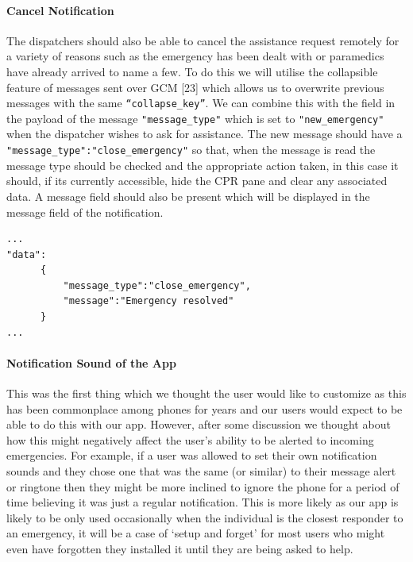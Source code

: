 \documentclass{article}
\begin{document}
	\pagebreak
	\paragraph{Cancel Notification}
	The dispatchers should also be able to cancel the assistance request remotely for a variety of reasons such as the emergency has been dealt with or paramedics have already arrived to name a few. To do this we will utilise the collapsible feature of messages sent over GCM [23] which allows us to overwrite previous messages with the same \texttt{\color{OliveGreen}“collapse\_key”}. We can combine this with the field in the payload of the message \texttt{\color{OliveGreen}"message\_type"} which is set to \texttt{\color{OliveGreen}"new\_emergency"} when the dispatcher wishes to ask for assistance. The new message should have a  \texttt{\color{OliveGreen}"message\_type":"close\_emergency"} so that, when the message is read the message type should be checked and the appropriate action taken, in this case it should, if its currently accessible, hide the CPR pane and clear any associated data. A message field should also be present which will be displayed in the message field of the notification.
	\begin{lstlisting}
...
"data":
      {
          "message_type":"close_emergency",
          "message":"Emergency resolved"
      }
...
	\end{lstlisting}
	
	\paragraph{Notification Sound of the App}
	This was the first thing which we thought the user would like to customize as this has been  commonplace among phones for years and our users would expect to be able to do this with our app. However, after some discussion we thought about how this might negatively affect the user’s ability to be alerted to incoming emergencies. For example, if a user was allowed to set their own notification sounds and they chose one that was the same (or similar) to their message alert or ringtone then they might be more inclined to ignore the phone for a period of time believing it was just a regular notification. This is more likely as our app is likely to be only used occasionally when the individual is the closest responder to an emergency, it will be a case of ‘setup and forget’ for most users who might even have forgotten they installed it until they are being asked to help.\\
\end{document}

